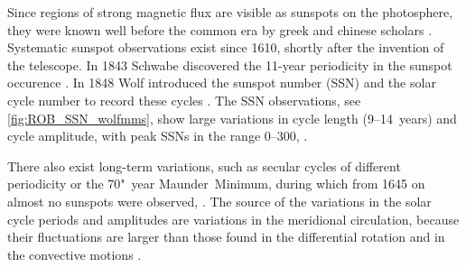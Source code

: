 Since regions of strong magnetic flux are visible as sunspots on the photosphere, they were known well before the common era by greek and chinese scholars \citep{Clark1978,Vaquero2007}. %
Systematic sunspot observations exist since 1610, shortly after the invention of the telescope. In 1843 Schwabe discovered the 11-year periodicity in the sunspot occurence \citep[p.~124]{Schroeder2004}. In 1848 Wolf introduced the sunspot number (SSN) and the solar cycle number to record these cycles \citep{Hathaway2015}.	%
The SSN observations, see \autoref{fig:ROB_SSN_wolfmms}, show large variations in cycle length (9--14~years) and cycle amplitude, with peak SSNs in the range 0--300, \citep{Hathaway2015}.
\begin{figure}[htb]
\end{figure}
There also exist long-term variations, such as secular cycles of different periodicity or the 70"~year Maunder~Minimum, during which from 1645 on almost no sunspots were observed, \citep{Maunder1890}.	%
The source of the variations in the solar cycle periods and amplitudes are variations in the meridional circulation, because their fluctuations are larger than those found in the differential rotation and in the convective motions \citep{Hathaway2015}.

